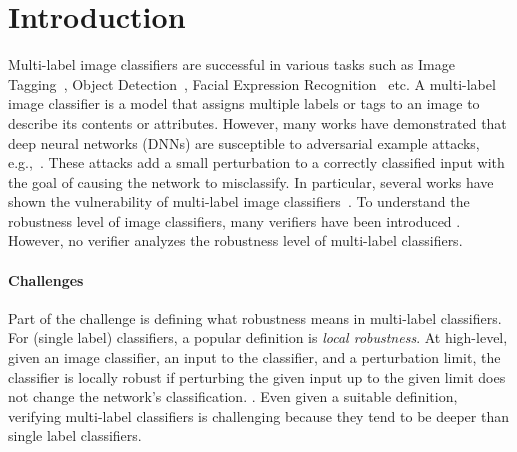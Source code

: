
\section{Introduction}

Multi-label image classifiers are successful in various tasks such as Image Tagging~\cite{IMAGETAGGING}, Object Detection~\cite{ObjectDetection}, Facial Expression Recognition~\cite{FacialRec} etc.
A multi-label image classifier is a model that assigns multiple labels or tags to an image to describe its contents or attributes.
However, many works have demonstrated that deep neural networks (DNNs) are susceptible to adversarial example attacks, e.g.,~\cite{ref7,ref15,szegedy2014intriguing,ref17,ref29,ref56}.
These attacks add a small perturbation to a correctly classified input with the goal of causing the network to misclassify.
In particular, several works have shown the vulnerability of multi-label image classifiers~\cite{MultiVul1, MultiVul2, MultiVul3}.
To understand the robustness level of image classifiers, many verifiers have been introduced .
However, no verifier analyzes the robustness level of multi-label classifiers. %

\paragraph{Challenges} Part of the challenge is defining what robustness means in multi-label classifiers.
For (single label) classifiers, a popular definition is \emph{local robustness}.
At high-level, given an image classifier, an input to the classifier, and a perturbation limit, the classifier is locally robust if perturbing the given input up to the given limit does not change the network's classification. .
Even given a suitable definition, verifying multi-label classifiers is challenging because they tend to be deeper than single label classifiers. 

